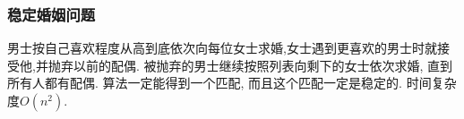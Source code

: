 \subsubsection{稳定婚姻问题}
         男士按自己喜欢程度从高到底依次向每位女士求婚,女士遇到更喜欢的男士时就接受他,并抛弃以前的配偶. 被抛弃的男士继续按照列表向剩下的女士依次求婚, 直到所有人都有配偶. 算法一定能得到一个匹配, 而且这个匹配一定是稳定的. 时间复杂度$O(n^2)$. 

